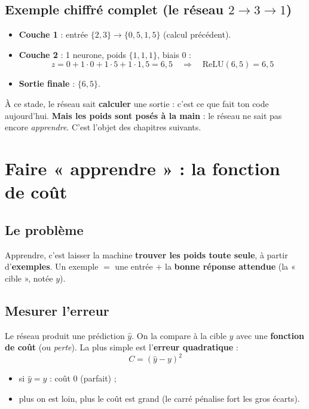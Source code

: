 \documentclass[11pt]{article}
\begin{document}
\subsection{Exemple chiffré complet (le réseau $2 \to 3 \to 1$)}
\begin{itemize}[leftmargin=2em]
  \item \textbf{Couche 1} : entrée $\{2,3\} \to \{0, 5, 1{,}5\}$ (calcul précédent).
  \item \textbf{Couche 2} : 1 neurone, poids $\{1,1,1\}$, biais $0$ :
  \[
  z = 0 + 1\cdot 0 + 1\cdot 5 + 1\cdot 1{,}5 = 6{,}5
  \quad\Rightarrow\quad \mathrm{ReLU}(6{,}5) = 6{,}5
  \]
  \item \textbf{Sortie finale} : $\{6{,}5\}$.
\end{itemize}

À ce stade, le réseau sait \textbf{calculer} une sortie : c'est ce que fait ton
code aujourd'hui. \textbf{Mais les poids sont posés à la main} : le réseau ne sait
pas encore \emph{apprendre}. C'est l'objet des chapitres suivants.

\section{Faire « apprendre » : la fonction de coût}

\subsection{Le problème}
Apprendre, c'est laisser la machine \textbf{trouver les poids toute seule}, à
partir d'\textbf{exemples}. Un exemple $=$ une entrée $+$ la \textbf{bonne réponse
attendue} (la « cible », notée $y$).

\subsection{Mesurer l'erreur}
Le réseau produit une prédiction $\hat{y}$. On la compare à la cible $y$ avec une
\textbf{fonction de coût} (ou \emph{perte}). La plus simple est l'\textbf{erreur
quadratique} :
\[
C = (\hat{y} - y)^2
\]
\begin{itemize}[leftmargin=2em]
  \item si $\hat{y} = y$ : coût $0$ (parfait) ;
  \item plus on est loin, plus le coût est grand (le carré pénalise fort les gros écarts).
\end{itemize}
\end{document}
